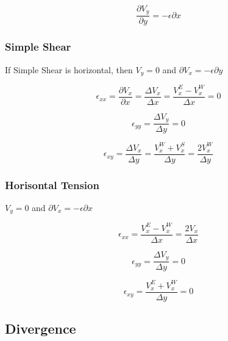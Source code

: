 \documentclass{article}
\begin{document}
    \begin{minipage}{0.4\textwidth}
        \begin{equation}
            \frac{\partial V_y}{\partial y} = -\epsilon \partial x
        \end{equation}
    \end{minipage}


    \subsubsection{Simple Shear}

    If Simple Shear is horizontal, then $V_y=0$ and $\partial V_x = -\epsilon \partial y$

    \begin{equation}
    {\epsilon_{xx} = \frac{\partial V_x}{\partial x} = \frac{\Delta V_x}{\Delta x}
        = \frac{V_{x}^{E} - V_{x}^{W}}{\Delta x} =0}
    \end{equation}

    \begin{equation}
    {\epsilon_{yy} = \frac{\Delta V_y}{\Delta y} = 0 }
    \end{equation}

    \begin{equation}
    {\epsilon_{xy} = \frac{\Delta V_x}{\Delta y} = \frac{V_{x}^{W} + V_{x}^{S}}{\Delta y} = \frac{2V_{x}^{W}}{\Delta y}}
    \end{equation}

    \subsubsection{Horisontal Tension}

    $V_y=0$ and $\partial V_x = -\epsilon \partial x$

    \begin{equation}
    {\epsilon_{xx} = \frac{V_{x}^{E} - V_{x}^{W}}{\Delta x} =\frac{2V_{x}}{\Delta x}}
    \end{equation}

    \begin{equation}
    {\epsilon_{yy} = \frac{\Delta V_y}{\Delta y} = 0 }
    \end{equation}

    \begin{equation}
    {\epsilon_{xy} = \frac{V_{x}^{E} + V_{x}^{W}}{\Delta y} = 0 }
    \end{equation}

    \subsection{Divergence}
\end{document}

